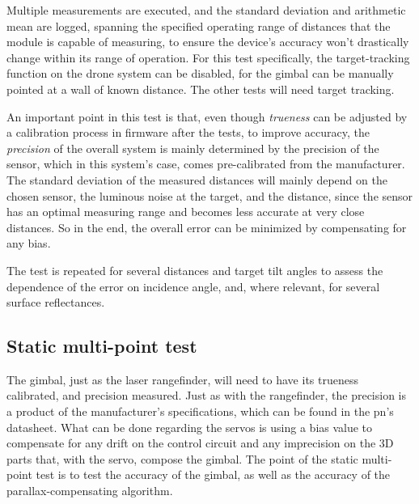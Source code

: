 Multiple measurements are executed, and the standard deviation
and arithmetic mean are logged, spanning the specified operating range of
distances that the module is capable of measuring, 
to ensure the device's accuracy won't drastically
change within its range of operation. 
For this test specifically, the target-tracking function on the drone system
can be
disabled, for the gimbal can be manually pointed at a wall of known distance.
The other tests will need target tracking.

An important point in this test is that, even though \emph{trueness} can be adjusted
by a calibration process in firmware after the tests, to improve accuracy,
the \emph{precision}
of the overall system is mainly determined by the precision of the sensor, which in
this system's case, comes pre-calibrated from the manufacturer.
The standard deviation of the measured distances will mainly depend on
the chosen sensor, the luminous noise at the target, and the distance,
since the sensor has an optimal measuring range and becomes less accurate
at very close distances.
So in the end, the overall error can be minimized by compensating for any bias.

The test is repeated for several
distances and target tilt angles to assess the dependence of the error on
incidence angle, and, where relevant, for several surface reflectances.

\subsection{Static multi-point test}

The gimbal, just as the laser rangefinder, will need to have its trueness
calibrated, and precision measured.
Just as with the rangefinder, the precision is a product of the
manufacturer's specifications, which can be found in the \gls{pn}'s datasheet.
What can be done regarding the servos is using a bias value to compensate for
any drift on the control circuit and any imprecision on the 3D parts that, with
the servo, compose the gimbal.
The point of the static multi-point test is to test the accuracy of the gimbal,
as well as the accuracy of the parallax-compensating algorithm.

